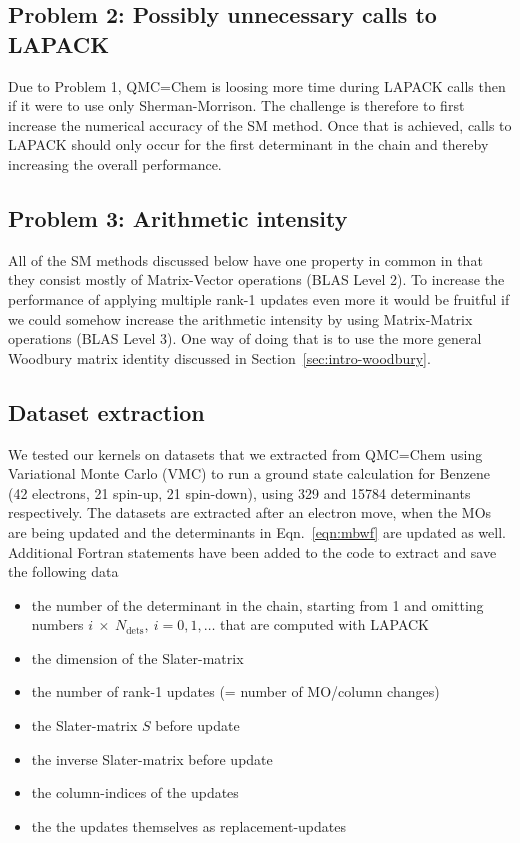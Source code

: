 \documentclass[11pt]{article}
\numberwithin{figure}{section}
\numberwithin{table}{section}
\begin{document}
			\subsection{Problem 2: Possibly unnecessary calls to LAPACK}
				Due to Problem 1, QMC=Chem is loosing more time during LAPACK calls then if it were to use only Sherman-Morrison. The challenge is therefore to first increase the numerical accuracy of the SM method. Once that is achieved, calls to LAPACK should only occur for the first determinant in the chain and thereby increasing the overall performance.
			
			\subsection{Problem 3: Arithmetic intensity}
				All of the SM methods discussed below have one property in common in that they consist mostly of Matrix-Vector operations (BLAS Level 2). To increase the performance of applying multiple rank-1 updates even more it would be fruitful if we could somehow increase the arithmetic intensity by using Matrix-Matrix operations (BLAS Level 3). One way of doing that is to use the more general Woodbury matrix identity discussed in Section~\ref{sec:intro-woodbury}.
				
			\subsection{Dataset extraction}
			
				We tested our kernels on datasets that we extracted from QMC=Chem using Variational Monte Carlo (VMC) to run a ground state calculation for Benzene (42 electrons, 21 spin-up, 21 spin-down), using 329 and 15784 determinants respectively. The datasets are extracted after an electron move, when the MOs are being updated and the determinants in Eqn.~\ref{eqn:mbwf} are updated as well. Additional Fortran statements have been added to the code to extract and save the following data
				\begin{itemize}
					\item the number of the determinant in the chain, starting from 1 and omitting numbers $i~\times~N_\mathrm{dets},~i=0,1,\ldots$ that are computed with LAPACK
					\item the dimension of the Slater-matrix
					\item the number of rank-1 updates (= number of MO/column changes)
					\item the Slater-matrix $S$ before update
					\item the inverse Slater-matrix before update
					\item the column-indices of the updates
					\item the the updates themselves as replacement-updates
			\end{itemize}
			
\end{document}
